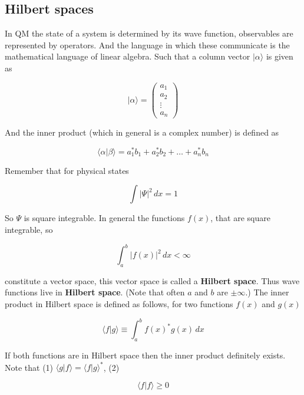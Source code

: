 \documentclass[a4paper]{article}
\begin{document}
\subsection{Hilbert spaces}

In QM the state of a system is determined by its wave function, observables are represented by operators. And the language in which these communicate is the mathematical language of linear algebra. Such that a column vector $|\alpha\rangle$ is given as

\begin{equation}
	|\alpha\rangle=\begin{pmatrix} a_1 \\ a_2 \\ \vdots \\ a_n\end{pmatrix}
\end{equation}

And the inner product (which in general is a complex number) is defined as

\begin{equation}
	\langle\alpha |\beta\rangle = a_1^*b_1 + a_2^*b_2 + \dots + a_n^*b_n
\end{equation}

Remember that for physical states 

\begin{equation}
	\int |\Psi|^2\,dx=1
\end{equation}

So $\Psi$ is square integrable. In general the functions $f(x)$, that are square integrable, so

\begin{equation}
	\int_a^b |f(x)|^2\,dx<\infty
\end{equation}

constitute a vector space, this vector space is called a \textbf{Hilbert space}. Thus wave functions live in \textbf{Hilbert space}. (Note that often $a$ and $b$ are $\pm\infty$.) The inner product in Hilbert space is defined as follows, for two functions $f(x)$ and $g(x)$

\begin{equation}
	\langle f | g \rangle\equiv\int_a^b f(x)^*g(x)\,dx
\end{equation}

If both functions are in Hilbert space then the inner product definitely exists. Note that (1) $\langle g | f \rangle=\langle f | g \rangle^*$, (2)

\begin{equation}
	\langle f | f \rangle\ge 0
\end{equation}
\end{document}
